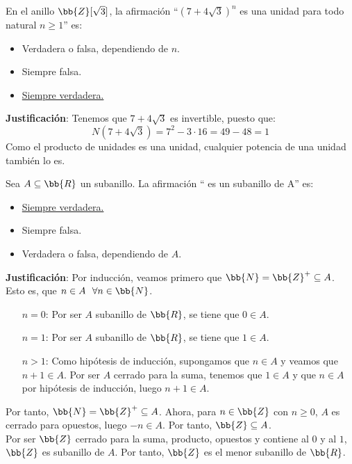 \begin{ejercicio}
    En el anillo $\bb{Z}[\sqrt{3}]$, la afirmación ``$(7+4\sqrt{3})^n$ es una unidad para todo natural $n \geq 1$'' es:
    \begin{itemize}
        \item Verdadera o falsa, dependiendo de $n$.
        \item Siempre falsa.
        \item \underline{Siempre verdadera.}
    \end{itemize}

    \noindent
    \textbf{Justificación}:
    Tenemos que $7 + 4\sqrt{3}$ es invertible, puesto que:
    $$N(7+4\sqrt{3}) = 7^2 - 3 \cdot 16 = 49 - 48 = 1$$
    Como el producto de unidades es una unidad, cualquier potencia de una unidad también lo es.
\end{ejercicio}

\begin{ejercicio}
    Sea $A \subseteq \bb{R}$ un subanillo. La afirmación `` es un subanillo de A'' es:
    \begin{itemize}
        \item \underline{Siempre verdadera.}
        \item Siempre falsa.
        \item Verdadera o falsa, dependiendo de $A$.
    \end{itemize}

    \noindent
    \textbf{Justificación}:
    Por inducción, veamos primero que $\bb{N} = \bb{Z}^{+} \subseteq A$.\newline
    Esto es, que $n \in A~~\forall n \in \bb{N}$.
    \begin{enumerate}
        \item [$n=0$:]
            Por ser $A$ subanillo de $\bb{R}$, se tiene que $0 \in A$.
        \item [$n=1$:]
            Por ser $A$ subanillo de $\bb{R}$, se tiene que $1 \in A$.
        \item [$n>1$:]
            Como hipótesis de inducción, supongamos que $n \in A$ y veamos que $n+1 \in A$.\newline
            Por ser $A$ cerrado para la suma, tenemos que $1 \in A$ y que $n \in A$ por hipótesis de inducción, luego $n+1 \in A$.
    \end{enumerate}
    Por tanto, $\bb{N} = \bb{Z}^{+} \subseteq A$.\newline
    Ahora, para $n \in \bb{Z}$ con $n \geq 0$, $A$ es cerrado para opuestos, luego $-n \in A$.\newline
    Por tanto, $\bb{Z} \subseteq A$.\\

    \noindent
    Por ser $\bb{Z}$ cerrado para la suma, producto, opuestos y contiene al $0$ y al $1$, $\bb{Z}$ es subanillo de $A$. Por tanto, $\bb{Z}$ es el menor subanillo de $\bb{R}$.
\end{ejercicio}

\newpage
\resetearcontador

